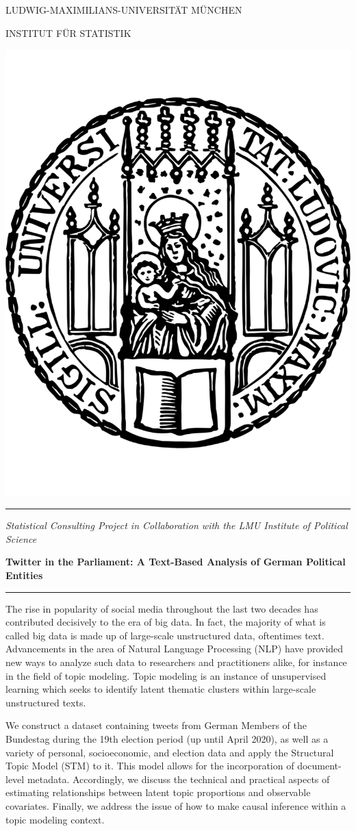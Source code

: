 \documentclass[12pt,reqno]{article}
\begin{document}
\begin{titlepage}
\thispagestyle{empty}
\begin{center}
\vspace{-1cm}
\begin{large}
LUDWIG-MAXIMILIANS-UNIVERSITÄT MÜNCHEN \\
\end{large}
\vspace{0.2cm}
INSTITUT FÜR STATISTIK
\vspace{-0.7cm}
\end{center}
\begin{center}
\includegraphics[width = 0.3 \textwidth]{Sigillum.pdf}
\end{center}
\vspace{-1cm}
\rule{\textwidth}{1.5pt}
\begin{center}
\textit{Statistical Consulting Project in Collaboration with the LMU Institute of Political Science} \\
\begin{Large}
\textbf{Twitter in the Parliament: A Text-Based Analysis of German Political Entities} \\ 
\end{Large}
\end{center}
\rule{\textwidth}{1.5pt}

\noindent
The rise in popularity of social media throughout the last two decades has contributed decisively to the era of big data. In fact, the majority of what is called big data is made up of large-scale unstructured data, oftentimes text. Advancements in the area of Natural Language Processing (NLP) have provided new ways to analyze such data to researchers and practitioners alike, for instance in the field of topic modeling. Topic modeling is an instance of unsupervised learning which seeks to identify latent thematic clusters within large-scale unstructured texts.

We construct a dataset containing tweets from German Members of the Bundestag during the 19th election period (up until April 2020), as well as a variety of personal, socioeconomic, and election data and apply the Structural Topic Model (STM) to it. This model allows for the incorporation of document-level metadata. Accordingly, we discuss the technical and practical aspects of estimating relationships between latent topic proportions and observable covariates. Finally, we address the issue of how to make causal inference within a topic modeling context. \\


\end{titlepage}
\end{document}
